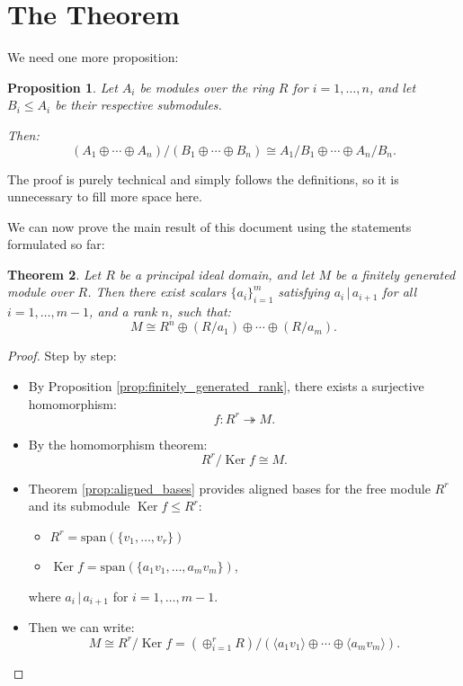 \documentclass{article}
\newif\ifusemulticols
\theoremstyle{definition}
\theoremstyle{remark}
\theoremstyle{plain}
\newtheorem{theorem}{Theorem}
\theoremstyle{plain}
\newtheorem{prop}[theorem]{Proposition}
\newenvironment{mymulticols}
    { \ifusemulticols \begin{multicols}{2} \fi }
    { \ifusemulticols \end{multicols} \fi }
\DeclareMathOperator{\Ker}{Ker}
\begin{document}
\begin{mymulticols}
\section{The Theorem}%
\label{sec:the_theorem}

We need one more proposition:
\begin{prop}
    Let $A_i$ be modules over the ring $R$ for $i = 1, \ldots, n$, and let $B_i \le A_i$ be their
    respective submodules.

    Then:
    $$(A_1 \oplus \cdots \oplus A_n) / (B_1 \oplus \cdots \oplus B_n) \cong A_1 / B_1 \oplus \cdots \oplus A_n / B_n.$$
\end{prop}

The proof is purely technical and simply follows the definitions, so it is unnecessary to fill more
space here.

We can now prove the main result of this document using the statements formulated so far:

\begin{theorem}
    Let $R$ be a principal ideal domain, and let $M$ be a finitely generated module over $R$. Then
    there exist scalars $\{a_i\}_{i=1}^m$ satisfying $a_i \,|\, a_{i+1}$ for all $i = 1, \ldots,
    m-1$, and a rank $n$, such that: $$M \cong R^n \oplus (R / a_1) \oplus \cdots \oplus (R / a_m).$$
\end{theorem}
\begin{proof}
    Step by step:
    \begin{itemize}
        \item By Proposition \ref{prop:finitely_generated_rank}, there exists a surjective homomorphism: $$f : R^r \twoheadrightarrow M.$$
        \item By the homomorphism theorem: $$R^r / \Ker f \cong M.$$
        \item Theorem \ref{prop:aligned_bases} provides aligned bases for the free module $R^r$ and
            its submodule $\Ker f \le R^r$:
            \begin{itemize}
                \item $R^r = \text{span}(\{v_1, \ldots, v_r\})$
                \item $\Ker f = \text{span}(\{a_1 v_1, \ldots, a_m v_m\})$,
            \end{itemize}
            where $a_i \,|\, a_{i+1}$ for $i = 1, \ldots, m-1$.

        \item Then we can write:
            $$M \cong R^r / \Ker f = \left(\oplus_{i=1}^r R\right) / \left(\langle a_1 v_1 \rangle \oplus \cdots \oplus \langle a_m v_m \rangle\right).$$


\end{itemize}
\end{proof}
\end{mymulticols}
\end{document}
